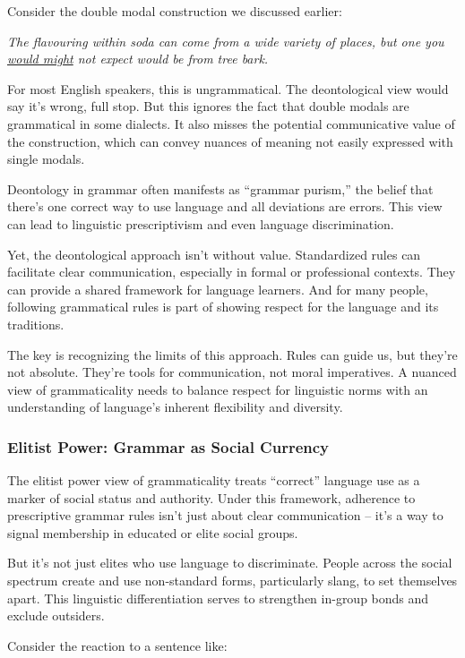 Consider the double modal construction we discussed earlier:

\ea \textit{The flavouring within soda can come from a wide variety of places, but one you \uline{would might} not expect would be from tree bark.}
\z

For most English speakers, this is ungrammatical. The deontological view would say it's wrong, full stop. But this ignores the fact that double modals are grammatical in some dialects. It also misses the potential communicative value of the construction, which can convey nuances of meaning not easily expressed with single modals.

Deontology in grammar often manifests as ``grammar purism,'' the belief that there's one correct way to use language and all deviations are errors. This view can lead to linguistic prescriptivism and even language discrimination.

Yet, the deontological approach isn't without value. Standardized rules can facilitate clear communication, especially in formal or professional contexts. They can provide a shared framework for language learners. And for many people, following grammatical rules is part of showing respect for the language and its traditions.

The key is recognizing the limits of this approach. Rules can guide us, but they're not absolute. They're tools for communication, not moral imperatives. A nuanced view of grammaticality needs to balance respect for linguistic norms with an understanding of language's inherent flexibility and diversity.

\subsubsection{Elitist Power: Grammar as Social Currency}

The elitist power view of grammaticality treats ``correct'' language use as a marker of social status and authority. Under this framework, adherence to prescriptive grammar rules isn't just about clear communication -- it's a way to signal membership in educated or elite social groups.

But it's not just elites who use language to discriminate. People across the social spectrum create and use non-standard forms, particularly slang, to set themselves apart. This linguistic differentiation serves to strengthen in-group bonds and exclude outsiders.

Consider the reaction to a sentence like:


